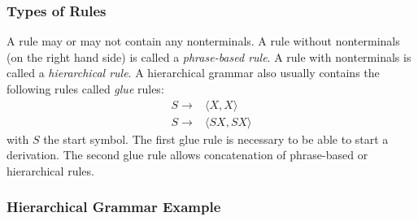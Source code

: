 \subsubsection{Types of Rules}

A rule may or may not contain any nonterminals.
A rule without nonterminals (on the right hand side) is
called a \emph{phrase-based rule}. A rule with nonterminals
is called a \emph{hierarchical rule}.
A hierarchical grammar also usually contains the following rules
called \emph{glue} rules:
%
\begin{align}
  S \rightarrow& \langle X, X \rangle \nonumber \\
  S \rightarrow& \langle S X, S X \rangle \nonumber
\end{align}
%
with $S$ the start symbol. The first glue rule is necessary to
be able to start a derivation.
The second glue rule allows concatenation of phrase-based or
hierarchical rules.

%

\subsubsection{Hierarchical Grammar Example}


